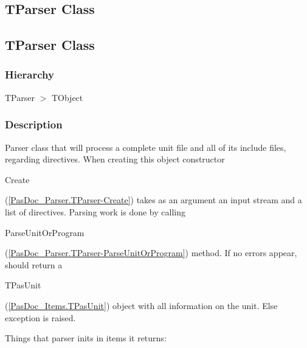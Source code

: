 \documentclass{report}
\begin{document}
\subsection*{\large{\textbf{TParser Class}}\normalsize\hspace{1ex}\hrulefill}
\else
\subsection*{TParser Class}
\fi
\label{PasDoc_Parser.TParser}
\subsubsection*{\large{\textbf{Hierarchy}}\normalsize\hspace{1ex}\hfill}
TParser {$>$} TObject
\subsubsection*{\large{\textbf{Description}}\normalsize\hspace{1ex}\hfill}
Parser class that will process a complete unit file and all of its include files, regarding directives. When creating this object constructor \begin{ttfamily}Create\end{ttfamily}(\ref{PasDoc_Parser.TParser-Create}) takes as an argument an input stream and a list of directives. Parsing work is done by calling \begin{ttfamily}ParseUnitOrProgram\end{ttfamily}(\ref{PasDoc_Parser.TParser-ParseUnitOrProgram}) method. If no errors appear, should return a \begin{ttfamily}TPasUnit\end{ttfamily}(\ref{PasDoc_Items.TPasUnit}) object with all information on the unit. Else exception is raised.

Things that parser inits in items it returns:
\end{document}
